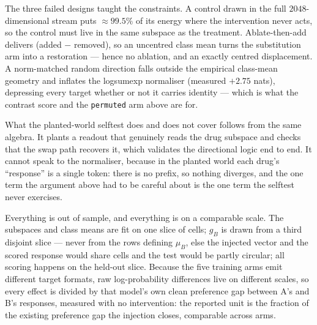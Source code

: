 The three failed designs taught the constraints. A control drawn in the full $2048$-dimensional
stream puts $\approx 99.5\%$ of its energy where the intervention never acts, so the control must
live in the same subspace as the treatment. Ablate-then-add delivers (added $-$ removed), so an
uncentred class mean turns the substitution arm into a restoration --- hence no ablation, and an
exactly centred displacement. A norm-matched random direction falls outside the empirical
class-mean geometry and inflates the logsumexp normaliser (measured $+2.75$ nats), depressing every target whether or not it
carries identity --- which is what the contrast score and the \texttt{permuted} arm above are for.

What the planted-world selftest does and does not cover follows from the same algebra. It plants a
readout that genuinely reads the drug subspace and checks that the swap path recovers it, which
validates the directional logic end to end. It cannot speak to the normaliser, because in the
planted world each drug's ``response'' is a single token: there is no prefix, so nothing diverges,
and the one term the argument above had to be careful about is the one term the selftest never
exercises.

Everything is out of sample, and everything is on a comparable scale. The subspaces and class means
are fit on one slice of cells; $g_B$ is drawn from a third disjoint slice --- never from the rows
defining $\mu_B$, else the injected vector and the scored response would share cells and the test
would be partly circular; all scoring happens on the held-out slice. Because the five training arms
emit different target formats, raw log-probability differences live on different scales, so every
effect is divided by that model's own clean preference gap between A's and B's responses, measured
with no intervention: the reported unit is the fraction of the existing preference gap the injection
closes, comparable across arms.

